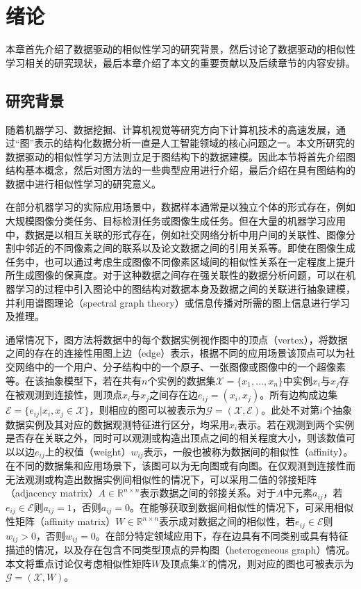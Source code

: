 \chapter{绪论}
本章首先介绍了数据驱动的相似性学习的研究背景，然后讨论了数据驱动的相似性学习相关的研究现状，最后本章介绍了本文的重要贡献以及后续章节的内容安排。
\section{研究背景}
随着机器学习、数据挖掘、计算机视觉等研究方向下计算机技术的高速发展，通过“图”\cite{chung1997spectral}表示的结构化数据分析一直是人工智能领域的核心问题之一。本文所研究的数据驱动的相似性学习方法则立足于图结构下的数据建模。因此本节将首先介绍图结构基本概念，然后对图方法的一些典型应用进行介绍，最后介绍在具有图结构的数据中进行相似性学习的研究意义。

在部分机器学习的实际应用场景中，数据样本通常是以独立个体的形式存在，例如大规模图像分类任务、目标检测任务或图像生成任务。但在大量的机器学习应用中，数据是以相互关联的形式存在，例如社交网络分析中用户间的关联性、图像分割中邻近的不同像素之间的联系以及论文数据之间的引用关系等。即使在图像生成任务中，也可以通过考虑生成图像不同像素区域间的相似性关系在一定程度上提升所生成图像的保真度\cite{zhang2018self}。对于这种数据之间存在强关联性的数据分析问题，可以在机器学习的过程中引入图论中的图结构对数据本身及数据之间的关联进行抽象建模，并利用谱图理论（spectral graph theory）\cite{chung1997spectral}或信息传播对所需的图上信息进行学习及推理。

通常情况下，图方法将数据中的每个数据实例视作图中的顶点（vertex），将数据之间的存在的连接性用图上边（edge）表示，根据不同的应用场景该顶点可以为社交网络中的一个用户、分子结构中的一个原子、一张图像或图像中的一个超像素等。在该抽象模型下，若在共有$n$个实例的数据集$\mathcal{X}=\{x_1,\dots,x_n\}$中实例$x_i$与$x_j$存在被观测到连接性，则顶点$x_i$与$x_j$之间存在边$e_{ij}=(x_i, x_j)$。所有边构成边集$\mathcal{E}=\{e_{ij}|x_i, x_j\in \mathcal{X}\}$，则相应的图可以被表示为$\mathcal{G} = (\mathcal{X}, \mathcal{E})$。此处不对第$i$个抽象数据实例及其对应的数据观测特征进行区分，均采用$x_i$表示。若在观测到两个实例是否存在关联之外，同时可以观测或构造出顶点之间的相关程度大小，则该数值可以以边$e_{ij}$上的权值（weight）$w_{ij}$表示，一般也被称为数据间的相似性（affinity）。在不同的数据集和应用场景下，该图可以为无向图或有向图。在仅观测到连接性而无法观测或构造出数据实例间相似性的情况下，可以采用二值的邻接矩阵（adjacency matrix）$A\in\mathbb{R}^{n\times n}$表示数据之间的邻接关系。对于$A$中元素$a_{ij}$，若$e_{ij}\in \mathcal{E}$则$a_{ij}=1$，否则$a_{ij}=0$。在能够获取到数据间相似性的情况下，可采用相似性矩阵（affinity matrix）$W\in\mathbb{R}^{n\times n}$表示成对数据之间的相似性，若$e_{ij}\in \mathcal{E}$则$w_{ij}>0$，否则$w_{ij}=0$。在部分特定领域应用下，存在边具有不同类别或具有特征描述的情况，以及存在包含不同类型顶点的异构图（heterogeneous graph）情况。本文将重点讨论仅考虑相似性矩阵$W$及顶点集$\mathcal{X}$的情况，则对应的图也可被表示为$\mathcal{G} = (\mathcal{X}, W)$。

